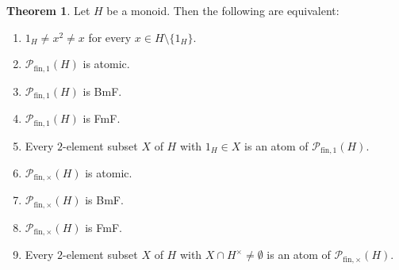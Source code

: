 \documentclass{report}
\renewcommand{\P}{\mathcal{P}}
\newcommand{\funt}{{\textrm{fin}, \times}}
\newcommand{\fun}{{\textrm{fin}, 1}}
\renewcommand{\:}{\text{:}}
\theoremstyle{definition}
\newtheorem{thm}[defn]{Theorem}
\begin{document}
%
\begin{thm}\label{BmF-char}
	Let $H$ be a monoid. Then the following are equivalent:
	\begin{enumerate}[label={\rm (\alph{*})}]
		\item\label{it:BmF-char(a)} $1_H \ne x^2 \ne x$ for every $x \in H \setminus \{1_H\}$.
		\item\label{it:BmF-char(b)} $\P_\fun(H)$ is atomic.
		\item\label{it:BmF-char(c)} $\P_\fun(H)$ is \textup{BmF}.
		\item\label{it:BmF-char(d)} $\P_\fun(H)$ is \textup{FmF}.
		\item\label{it:BmF-char(e)} Every $2$-element subset $X$ of $H$ with $1_H \in X$ is an atom of $\mathcal P_\fun(H)$.
		\item\label{it:BmF-char(f)} $\P_\funt(H)$ is atomic.
		\item\label{it:BmF-char(g)} $\P_\funt(H)$ is \textup{BmF}.
		\item\label{it:BmF-char(h)} $\P_\funt(H)$ is \textup{FmF}.
		\item\label{it:BmF-char(i)} Every $2$-element subset $X$ of $H$ with $X \cap H^\times \ne \emptyset$ is an atom of $\mathcal P_\funt(H)$.
	\end{enumerate}
\end{thm}
%
\end{document}
